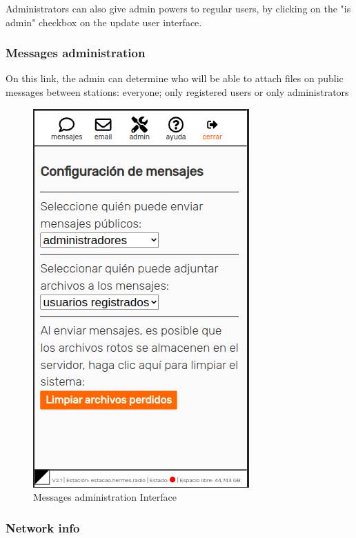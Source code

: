 \documentclass[11pt,a4paper]{article}
\begin{document}
    Administrators can also give admin powers to regular users, by clicking on the "is admin" checkbox on the update user interface.

\subsubsection{Messages administration}  
\label{gui_msg_admin}

On this link, the admin can determine who will be able to attach files on public messages between stations: everyone; only registered users or only administrators
   
    \begin{figure}[H]
    \centering
    \includegraphics[width=0.5\columnwidth]{screenshots/frontend/es/messageadm.png}
    \caption{Messages administration Interface}
    \label{fig:messageadm}
   
    \end{figure}
    
\subsubsection{Network info} 
\label{gui_net_info}
\end{document}
